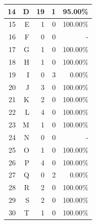 \begin{longtable}[c]{|r|r|r|r|r|}
	14           & D                 & 19                       & 1                       &95.00\%            \\ \hline
	15           & E                 & 1                       & 0                       &100.00\%            \\ \hline
	16           & F                 & 0                       & 0                       & -            \\ \hline
	17           & G                 & 1                       & 0                       &100.00\%            \\ \hline
	18           & H                 & 1                       & 0                       &100.00\%            \\ \hline
	19           & I                 & 0                       & 3                       &0.00\%            \\ \hline
	20           & J                 & 3                       & 0                       &100.00\%            \\ \hline
	21           & K                 & 2                       & 0                       &100.00\%            \\ \hline
	22           & L                 & 4                       & 0                       &100.00\%            \\ \hline
	23           & M                 & 1                       & 0                       &100.00\%            \\ \hline
	24           & N                 & 0                       & 0                       & -            \\ \hline
	25           & O                 & 1                       & 0                       &100.00\%            \\ \hline
	26           & P                 & 4                       & 0                       &100.00\%            \\ \hline
	27           & Q                 & 0                       & 2                       &0.00\%            \\ \hline
	28           & R                 & 2                       & 0                       &100.00\%            \\ \hline
	29           & S                 & 2                       & 0                       &100.00\%            \\ \hline
	30           & T                 & 1                       & 0                       &100.00\%            \\ \hline

\end{longtable}
